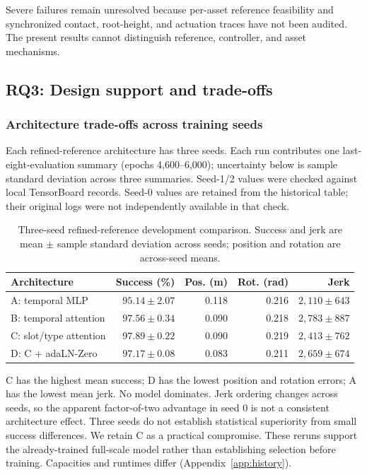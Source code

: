 \documentclass[11pt]{article}
\begin{document}
Severe failures remain unresolved because per-asset reference feasibility
and synchronized contact, root-height, and actuation traces have not been
audited. The present results cannot distinguish reference, controller, and
asset mechanisms.

\subsection{RQ3: Design support and trade-offs}
\subsubsection{Architecture trade-offs across training seeds}\label{sec:architecture_results}
Each refined-reference architecture has three seeds. Each run contributes
one last-eight-evaluation summary (epochs 4,600--6,000); uncertainty below is
sample standard deviation across three summaries. Seed-1/2 values were checked
against local TensorBoard records. Seed-0 values are retained from the
historical table; their original logs were not independently available in that check.

\begin{table}[t]
\centering\small
\caption{Three-seed refined-reference development comparison. Success and
jerk are mean $\pm$ sample standard deviation across seeds; position and
rotation are across-seed means.}\label{tab:architecture_seeds}
\begin{tabularx}{\linewidth}{@{}Yrrrr@{}}
\toprule
Architecture & Success (\%) & Pos. (m) & Rot. (rad) & Jerk \\
\midrule
A: temporal MLP & $95.14\pm2.07$ & 0.118 & 0.216 & $2{,}110\pm643$ \\
B: temporal attention & $97.56\pm0.34$ & 0.090 & 0.218 & $2{,}783\pm887$ \\
C: slot/type attention & $97.89\pm0.22$ & 0.090 & 0.219 & $2{,}413\pm762$ \\
D: C + adaLN-Zero & $97.17\pm0.08$ & 0.083 & 0.211 & $2{,}659\pm674$ \\
\bottomrule
\end{tabularx}
\end{table}

C has the highest mean success; D has the lowest position and rotation errors;
A has the lowest mean jerk. No model dominates. Jerk ordering changes across
seeds, so the apparent factor-of-two advantage in seed 0 is not a consistent
architecture effect. Three seeds do not establish statistical superiority
from small success differences. We retain C as a practical compromise.
These reruns support the already-trained full-scale model rather than
establishing selection before training. Capacities and runtimes differ
(Appendix~\ref{app:history}).
\end{document}

